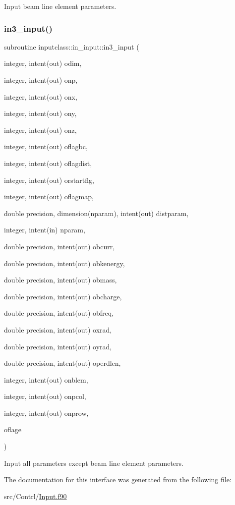 Input beam line element parameters. 

\mbox{\label{interfaceinputclass_1_1in__input_a63ed05a3bbf8218a4e904127e9c6c269}} 
\subsubsection{\texorpdfstring{in3\_input()}{in3\_input()}}
{\footnotesize\ttfamily subroutine inputclass\+::in\+\_\+input\+::in3\+\_\+input (\begin{DoxyParamCaption}\item[{integer, intent(out)}]{odim,  }\item[{integer, intent(out)}]{onp,  }\item[{integer, intent(out)}]{onx,  }\item[{integer, intent(out)}]{ony,  }\item[{integer, intent(out)}]{onz,  }\item[{integer, intent(out)}]{oflagbc,  }\item[{integer, intent(out)}]{oflagdist,  }\item[{integer, intent(out)}]{orstartflg,  }\item[{integer, intent(out)}]{oflagmap,  }\item[{double precision, dimension(nparam), intent(out)}]{distparam,  }\item[{integer, intent(in)}]{nparam,  }\item[{double precision, intent(out)}]{obcurr,  }\item[{double precision, intent(out)}]{obkenergy,  }\item[{double precision, intent(out)}]{obmass,  }\item[{double precision, intent(out)}]{obcharge,  }\item[{double precision, intent(out)}]{obfreq,  }\item[{double precision, intent(out)}]{oxrad,  }\item[{double precision, intent(out)}]{oyrad,  }\item[{double precision, intent(out)}]{operdlen,  }\item[{integer, intent(out)}]{onblem,  }\item[{integer, intent(out)}]{onpcol,  }\item[{integer, intent(out)}]{onprow,  }\item[{}]{oflage }\end{DoxyParamCaption})}



Input all parameters except beam line element parameters. 



The documentation for this interface was generated from the following file\+:\begin{DoxyCompactItemize}
\item 
src/\+Contrl/\mbox{\hyperlink{_input_8f90}{Input.\+f90}}\end{DoxyCompactItemize}
